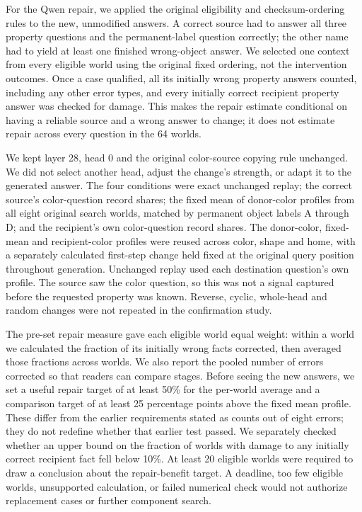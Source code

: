\documentclass[10pt,letterpaper]{article}
\begin{document}
For the Qwen repair, we applied the original eligibility and checksum-ordering rules to the new, unmodified answers. A correct source had to answer all three property questions and the permanent-label question correctly; the other name had to yield at least one finished wrong-object answer. We selected one context from every eligible world using the original fixed ordering, not the intervention outcomes. Once a case qualified, all its initially wrong property answers counted, including any other error types, and every initially correct recipient property answer was checked for damage. This makes the repair estimate conditional on having a reliable source and a wrong answer to change; it does not estimate repair across every question in the 64 worlds.


We kept layer 28, head 0 and the original color-source copying rule unchanged. We did not select another head, adjust the change's strength, or adapt it to the generated answer. The four conditions were exact unchanged replay; the correct source's color-question record shares; the fixed mean of donor-color profiles from all eight original search worlds, matched by permanent object labels A through D; and the recipient's own color-question record shares. The donor-color, fixed-mean and recipient-color profiles were reused across color, shape and home, with a separately calculated first-step change held fixed at the original query position throughout generation. Unchanged replay used each destination question's own profile. The source saw the color question, so this was not a signal captured before the requested property was known. Reverse, cyclic, whole-head and random changes were not repeated in the confirmation study.


The pre-set repair measure gave each eligible world equal weight: within a world we calculated the fraction of its initially wrong facts corrected, then averaged those fractions across worlds. We also report the pooled number of errors corrected so that readers can compare stages. Before seeing the new answers, we set a useful repair target of at least 50\% for the per-world average and a comparison target of at least 25 percentage points above the fixed mean profile. These differ from the earlier requirements stated as counts out of eight errors; they do not redefine whether that earlier test passed. We separately checked whether an upper bound on the fraction of worlds with damage to any initially correct recipient fact fell below 10\%. At least 20 eligible worlds were required to draw a conclusion about the repair-benefit target. A deadline, too few eligible worlds, unsupported calculation, or failed numerical check would not authorize replacement cases or further component search.
\end{document}
